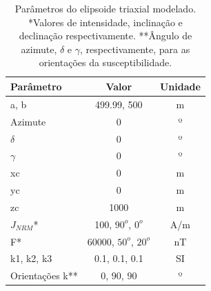 \begin{table}[h!]
	\begin{center}
		\begin{tabular}{|l|c|c|}
			\hline
			\textbf{Parâmetro}  & \textbf{Valor} & \textbf{Unidade} \\
			\hline 
			a, b   & 499.99, 500 & m\\
			\hline
			Azimute   & $0$ & º\\
			\hline
			$\delta$    & $0$ & º\\
			\hline
			$\gamma$   & $0$  & º\\
			\hline
			xc   & 0  & m\\
			\hline          
			yc   & 0  & m\\
			\hline                
			zc   & 1000  & m\\
			\hline
			$J_{NRM}$*  & 100, $90^o$, $0^o$  & A/m\\
			\hline
			F*    & 60000, $50^o$, $20^o$ & nT \\
			\hline
			k1, k2, k3   & 0.1, 0.1, 0.1 & SI \\
			\hline
			Orientações k**   & $0$, $90$, $90$ & º \\
			\hline
		\end{tabular}
		\caption{Parâmetros do elipsoide triaxial modelado. *Valores de intensidade, inclinação e declinação respectivamente. **Ângulo de azimute, $\delta$ e $\gamma$, respectivamente, para as orientações da susceptibilidade.}
	\end{center}
	\label{tab:triaxial_oblate2}
\end{table}

